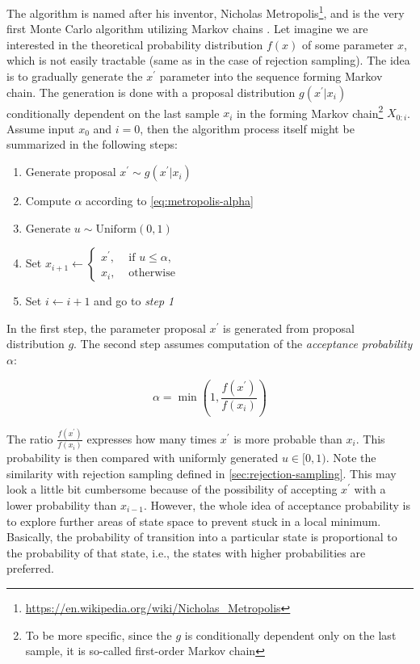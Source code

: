 \documentclass[
  digital, %
  oneside, %
  lof,     %
  lot,     %
]{fithesis4}
\begin{document}
The algorithm is named after his inventor, Nicholas Metropolis\footnote{\url{https://en.wikipedia.org/wiki/Nicholas_Metropolis}}, and is the very first Monte Carlo algorithm utilizing Markov chains \cite{metropolis1953}.
Let imagine we are interested in the theoretical probability distribution $f(x)$ of some parameter $x$, which is not easily tractable (same as in the case of rejection sampling).
The idea is to gradually generate the $x^\prime$ parameter into the sequence forming Markov chain.
The generation is done with a proposal distribution $g(x^\prime | x_{i})$ conditionally dependent on the last sample $x_{i}$ in the forming Markov chain\footnote{To be more specific, since the $g$ is conditionally dependent only on the last sample, it is so-called first-order Markov chain} $X_{0:i}$.
Assume input $x_0$ and $i = 0$, then the algorithm process itself might be summarized in the following steps:

\begin{enumerate}
  \item Generate proposal $x^\prime \sim g(x^\prime | x_{i})$
  \item Compute $\alpha$ according to \eqref{eq:metropolis-alpha}
  \item Generate $u \sim \text{Uniform}(0, 1)$
  \item Set $x_{i+1} \leftarrow \begin{cases}
    x^\prime, & \text{ if } u \leq \alpha,\\
    x_{i}, & \text{ otherwise}
    \end{cases}
    $
  \item Set $i \leftarrow i + 1$ and go to \textit{step 1}
\end{enumerate}

In the first step, the parameter proposal $x^\prime$ is generated from proposal distribution $g$.
The second step assumes computation of the \textit{acceptance probability} $\alpha$:

\begin{equation}\label{eq:metropolis-alpha}
  \alpha = \min \left(1, \frac{f(x^\prime)}{f(x_{i})}\right)
\end{equation}

The ratio $\frac{f(x^\prime)}{f(x_{i})}$ expresses how many times $x^\prime$ is more probable than $x_{i}$.
This probability is then compared with uniformly generated $u \in [0, 1)$. 
Note the similarity with rejection sampling defined in \autoref{sec:rejection-sampling}.
This may look a little bit cumbersome because of the possibility of accepting $x^\prime$ with a lower probability than $x_{i-1}$. However, the whole idea of acceptance probability is to explore further areas of state space to prevent stuck in a local minimum.
Basically, the probability of transition into a particular state is proportional to the probability of that state, i.e., the states with higher probabilities are preferred.
\end{document}
